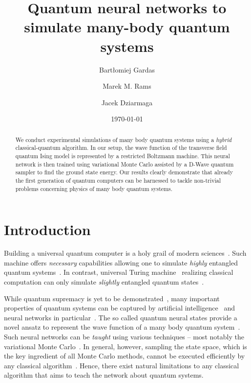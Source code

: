 \documentclass[aps,pra,showpacs,amsmath,amssymb,amsfonts,superscriptaddress,lengthcheck,longbibliography, twocolumn]{revtex4-1}
\begin{document}
%
\title{Quantum neural networks to simulate many-body quantum systems}
%
\author{Bart\l{}omiej Gardas}
\author{Marek M. Rams}
\author{Jacek Dziarmaga}

\date{\today}
\begin{abstract}	
We conduct experimental simulations of many body quantum systems using a \emph{hybrid} classical-quantum algorithm.
In our setup, the wave function of the transverse field quantum Ising model is represented by a restricted Boltzmann machine. 
This neural network is then trained using variational Monte Carlo assisted by a D-Wave quantum sampler to find
the ground state energy. Our results clearly demonstrate that already the first generation of quantum computers
can be harnessed to tackle non-trivial problems concerning physics of many body quantum systems.
\end{abstract}

\maketitle

\section{Introduction} 
%
Building a universal quantum computer is a holy grail of modern sciences~\cite{Cong17}. Such machine  offers \emph{necessary} 
capabilities allowing one to simulate \emph{highly} entangled quantum systems~\cite{Petruccione16,Adolfo17}. In contrast, universal 
Turing machine~\cite{Couder16} realizing classical computation can only simulate \emph{slightly} entangled quantum states~\cite{Vidal03}.  

While quantum supremacy is yet to be demonstrated~\cite{Terhal2018}, many important properties of quantum systems can be captured by artificial intelligence~\cite{Petruccione14} and neural networks in particular~\cite{Deng17,Gao17}. The so called quantum neural states provide a novel ansatz to represent the wave function of a many body quantum system~\cite{Carleo18,Cirac18}. Such neural networks can be \emph{taught} using various techniques -- most notably the variational Monte Carlo~\cite{Sorella98,Carlson15,Foulkes01}.
In general, however, sampling the state space, which is the key ingredient of all Monte Carlo methods, cannot be executed efficiently by any classical algorithm~\cite{Troyer04,Nielsen2010}. Hence, there exist natural limitations to any classical algorithm that aims to teach the network about quantum systems. 
\end{document}

